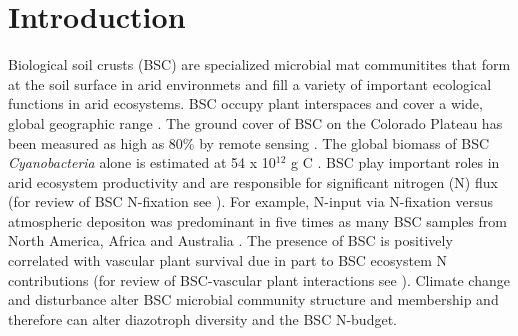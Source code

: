 \section{Introduction}
Biological soil crusts (BSC) are specialized microbial mat communitites that form at the soil surface in arid environmets and fill a variety of important ecological functions in arid ecosystems. BSC occupy plant interspaces and cover a
wide, global geographic range \citep{garcia2003estimates}. The ground cover of
BSC on the Colorado Plateau has been measured as high as 80\% by remote sensing
\citep{karnieli2001}. The global biomass of BSC \textit{Cyanobacteria} alone is
estimated at 54 x 10$^{12}$ g C \citep{garcia2003estimates}. BSC play important
roles in arid ecosystem productivity and are responsible for significant
nitrogen (N) flux (for review of BSC N-fixation see \citet{belnap2003}). For
example, N-input via N-fixation versus atmospheric depositon was predominant in
five times as many BSC samples from North America, Africa and Australia
\citep{Evans_1999}.  The presence of BSC is positively correlated with vascular
plant survival due in part to BSC ecosystem N contributions (for review of
BSC-vascular plant interactions see \citet{BelnapVascular}). Climate change and
disturbance alter BSC microbial community structure and membership and therefore
can alter diazotroph diversity and the BSC N-budget.

